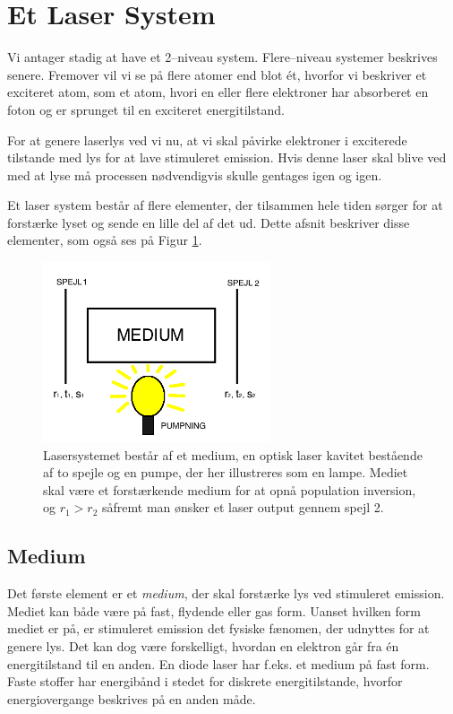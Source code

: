 \section{Et Laser System}
Vi antager stadig at have et 2--niveau system. Flere--niveau systemer beskrives senere. Fremover vil vi se på flere atomer end blot ét, hvorfor vi beskriver et exciteret atom, som et atom, hvori en eller flere elektroner har absorberet en foton og er sprunget til en exciteret energitilstand.   

For at genere laserlys ved vi nu, at vi skal påvirke elektroner i exciterede tilstande med lys for at lave stimuleret emission. Hvis denne laser skal blive ved med at lyse må processen nødvendigvis skulle gentages igen og igen. 

Et laser system består af flere elementer, der tilsammen hele tiden sørger for at forstærke lyset og sende en lille del af det ud. Dette afsnit beskriver disse elementer, som også ses på Figur \ref{fig:lasersystem}. 

\begin{figure}[h!]
  \centering
  \includegraphics[width=0.6\textwidth]{Laserfysik/lasersystem.png}
  \caption{Lasersystemet består af et medium, en optisk laser kavitet bestående af to spejle og en pumpe, der her illustreres som en lampe. Mediet skal være et forstærkende medium for at opnå population inversion, og $r_1>r_2$ såfremt man ønsker et laser output gennem spejl 2.}
  \label{fig:lasersystem}
\end{figure}

\subsection{Medium}
Det første element er et \emph{medium}, der skal forstærke lys ved stimuleret emission. Mediet kan både være på fast, flydende eller gas form. Uanset hvilken form mediet er på, er stimuleret emission det fysiske fænomen, der udnyttes for at genere lys. Det kan dog være forskelligt, hvordan en elektron går fra én energitilstand til en anden. En diode laser har f.eks. et medium på fast form. Faste stoffer har energibånd i stedet for diskrete energitilstande, hvorfor energiovergange beskrives på en anden måde. 


